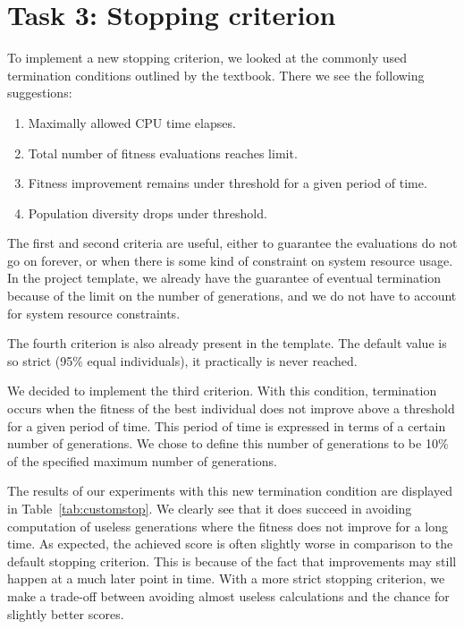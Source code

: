 \documentclass{report}
\begin{document}
\section{Task 3: Stopping criterion}
\label{sec:stopping_criterion}
To implement a new stopping criterion, we looked at the commonly used termination conditions outlined by the textbook. There we see the following suggestions:
\begin{enumerate}
	\item Maximally allowed CPU time elapses.
	\item Total number of fitness evaluations reaches limit.
	\item Fitness improvement remains under threshold for a given period of time.
	\item Population diversity drops under threshold.
\end{enumerate}
The first and second criteria are useful, either to guarantee the evaluations do not go on forever, or when there is some kind of constraint on system resource usage. In the project template, we already have the guarantee of eventual termination because of the limit on the number of generations, and we do not have to account for system resource constraints.

The fourth criterion is also already present in the template. The default value is so strict (95\% equal individuals), it practically is never reached.

We decided to implement the third criterion. With this condition, termination occurs when the fitness of the best individual does not improve above a threshold for a given period of time. This period of time is expressed in terms of a certain number of generations. We chose to define this number of generations to be 10\% of the specified maximum number of generations.

The results of our experiments with this new termination condition are displayed in Table~\ref{tab:customstop}. We clearly see that it does succeed in avoiding computation of useless generations where the fitness does not improve for a long time. As expected, the achieved score is often slightly worse in comparison to the default stopping criterion. This is because of the fact that improvements may still happen at a much later point in time. With a more strict stopping criterion, we make a trade-off between avoiding almost useless calculations and the chance for slightly better scores.


\end{document}
